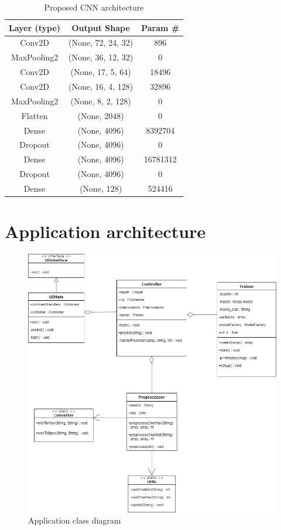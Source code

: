 \begin{table} [H]
	\centering
	\caption{Proposed CNN architecture}
	\begin{tabular}{ |c|c|c|} 
		\hline
		Layer (type) & Output Shape & Param \# \\ \hline
		Conv2D &  (None, 72, 24, 32) & 896 \\ \hline
		MaxPooling2 & (None, 36, 12, 32) & 0\\ \hline
		Conv2D & (None, 17, 5, 64) & 18496 \\ \hline
		Conv2D & (None, 16, 4, 128) & 32896 \\ \hline
		MaxPooling2 & (None, 8, 2, 128) & 0 \\ \hline
		Flatten & (None, 2048) & 0 \\ \hline
		Dense & (None, 4096) & 8392704 \\ \hline
		Dropout & (None, 4096) & 0 \\ \hline
		Dense & (None, 4096) & 16781312 \\ \hline
		Dropout & (None, 4096) & 0 \\ \hline
		Dense & (None, 128) & 524416 \\ \hline						
	\end{tabular}
	\label{table:cnn_architecture}
\end{table}
\newpage

\section{Application architecture}

\begin{figure}[H]
	\caption[Class diagram]{ Application class diagram }
	\centering
	\label{fig:class_diag}
	\includegraphics[width=1\textwidth, height=1\textheight, keepaspectratio]{"resources/class_diagram"}
\end{figure}
\clearpage

